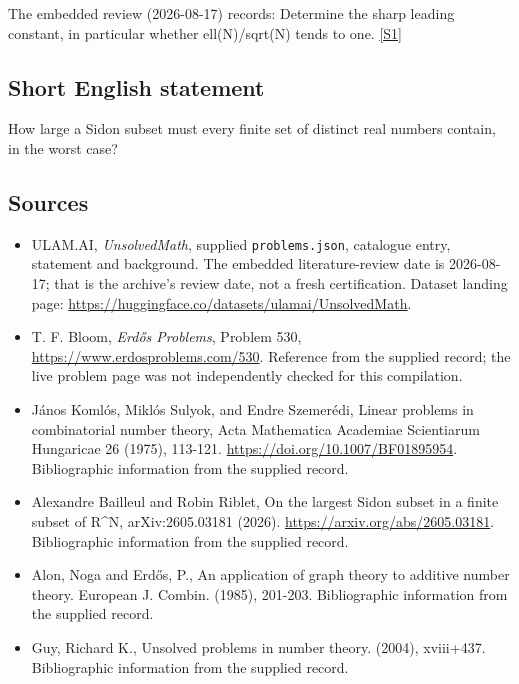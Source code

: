 \documentclass[11pt,a4paper]{article}
\newcommand{\sref}[2]{\hyperlink{source:#1:#2}{[S#2]}}
\begin{document}
The embedded review (2026-08-17) records: Determine the sharp leading constant, in particular whether ell(N)/sqrt(N) tends to one. \sref{statement}{1}

\subsection{Short English statement}

How large a Sidon subset must every finite set of distinct real numbers contain, in the worst case?

\subsection{Sources}

{\small

\begin{itemize}

\item[\hypertarget{source:statement:1}{S1}] ULAM.AI, \emph{UnsolvedMath}, supplied \texttt{problems.json}, catalogue entry, statement and background. The embedded literature-review date is 2026-08-17; that is the archive’s review date, not a fresh certification. Dataset landing page: \url{https://huggingface.co/datasets/ulamai/UnsolvedMath}.

\item[\hypertarget{source:statement:2}{S2}] T. F. Bloom, \emph{Erdős Problems}, Problem 530, \url{https://www.erdosproblems.com/530}. Reference from the supplied record; the live problem page was not independently checked for this compilation.

\item[\hypertarget{source:statement:3}{S3}] János Komlós, Miklós Sulyok, and Endre Szemerédi, Linear problems in combinatorial number theory, Acta Mathematica Academiae Scientiarum Hungaricae 26 (1975), 113-121. \url{https://doi.org/10.1007/BF01895954}. Bibliographic information from the supplied record.

\item[\hypertarget{source:statement:4}{S4}] Alexandre Bailleul and Robin Riblet, On the largest Sidon subset in a finite subset of R\textasciicircum{}N, arXiv:2605.03181 (2026). \url{https://arxiv.org/abs/2605.03181}. Bibliographic information from the supplied record.

\item[\hypertarget{source:statement:5}{S5}] Alon, Noga and Erd\H{o}s, P., An application of graph theory to additive number theory. European J. Combin. (1985), 201-203. Bibliographic information from the supplied record.

\item[\hypertarget{source:statement:6}{S6}] Guy, Richard K., Unsolved problems in number theory. (2004), xviii+437. Bibliographic information from the supplied record.

\end{itemize}

}

\label{end:statement}
\end{document}
